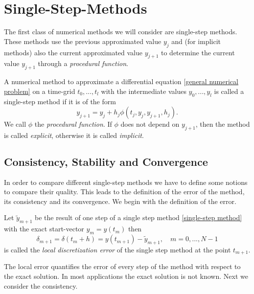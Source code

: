 \section{Single-Step-Methods}
	The first class of numerical methods we will consider are single-step methods. These methods use the previous approximated value $y_j$ and (for implicit methods) also the current approximated value $y_{j+1}$ to determine the current value $y_{j+1}$ through a \emph{procedural function}.
	
	\begin{definition}
		\label{def:single step mehod}
		A numerical method to approximate a differential equation \ref{general numerical problem} on a time-grid $t_0,...,t_l$ with the intermediate values $y_0,...,y_l$ is called a single-step method if it is of the form
		\begin{equation}
			\label{single-step method}
			y_{j+1} = y_j + h_j \phi(t_j,y_j, y_{j+1},h_j).
		\end{equation}
		We call $\phi$ the \emph{procedural function}. If $\phi$ does not depend on $y_{j+1}$, then the method is called \emph{explicit}, otherwise it is called \emph{implicit}.
	\end{definition}

	\subsection{Consistency, Stability and Convergence}
	
	In order to compare different single-step methods we have to define some notions to compare their quality. This leads to the definition of the error of the method, its consistency and its convergence. We begin with the definition of the error.
	
	\begin{definition}\label{Discretization_Error_SingleStep}
		Let $\tilde{y}_{m+1}$ be the result of one step of a single step method \eqref{single-step method} with the exact start-vector $y_m = y(t_m)$ then
		\begin{equation}
			\label{local discretization error single step}
			 \delta_{m+1} = \delta(t_m+h) = y(t_{m+1}) - \tilde{y}_{m+1}, \quad m = 0,...,N-1
		\end{equation}
		is called the \emph{local discretization error} of the single step method at the point $t_{m+1}$.
	\end{definition}

	The local error quantifies the error of every step of the method with respect to the exact solution. In most applications the exact solution is not known. Next we consider the consistency.

